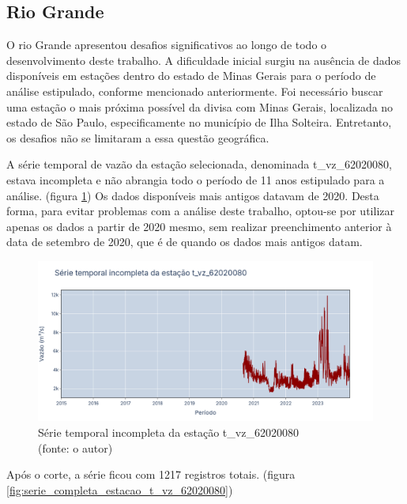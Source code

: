 \clearpage
\subsection{Rio Grande}

O rio Grande apresentou desafios significativos ao longo de todo o desenvolvimento deste trabalho. A dificuldade inicial surgiu na ausência de dados disponíveis em estações dentro do estado de Minas Gerais para o período de análise estipulado, conforme mencionado anteriormente. Foi necessário buscar uma estação o mais próxima possível da divisa com Minas Gerais, localizada no estado de São Paulo, especificamente no município de Ilha Solteira. Entretanto, os desafios não se limitaram a essa questão geográfica.

A série temporal de vazão da estação selecionada, denominada t\_vz\_62020080, estava incompleta e não abrangia todo o período de 11 anos estipulado para a análise. (figura \ref{fig:grandeSerieIncompleta_t_vz_62020080}) Os dados disponíveis mais antigos datavam de 2020. Desta forma, para evitar problemas com a análise deste trabalho, optou-se por utilizar apenas os dados a partir de 2020 mesmo, sem realizar preenchimento anterior à data de setembro de 2020, que é de quando os dados mais antigos datam.

\begin{figure}[!h]
	\centering
	\includegraphics[scale=0.25]{Figuras/rio_grande/grandeSerieIncompleta_t_vz_62020080.png}
	\caption{Série temporal incompleta da estação t\_vz\_62020080\\(fonte: o autor)}
	\label{fig:grandeSerieIncompleta_t_vz_62020080}
\end{figure}

Após o corte, a série ficou com 1217 registros totais. (figura \ref{fig:serie_completa_estacao_t_vz_62020080})

